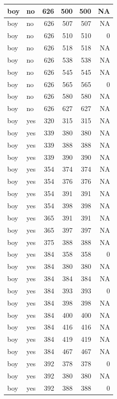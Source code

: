 \documentclass[man]{apa6}
\begin{document}
\begin{tabular}{l|l|r|r|r|r}
\hline
boy & no & 626 & 500 & 500 & NA\\
\hline
boy & no & 626 & 507 & 507 & NA\\
\hline
boy & no & 626 & 510 & 510 & 0\\
\hline
boy & no & 626 & 518 & 518 & NA\\
\hline
boy & no & 626 & 538 & 538 & NA\\
\hline
boy & no & 626 & 545 & 545 & NA\\
\hline
boy & no & 626 & 565 & 565 & 0\\
\hline
boy & no & 626 & 580 & 580 & NA\\
\hline
boy & no & 626 & 627 & 627 & NA\\
\hline
boy & yes & 320 & 315 & 315 & NA\\
\hline
boy & yes & 339 & 380 & 380 & NA\\
\hline
boy & yes & 339 & 388 & 388 & NA\\
\hline
boy & yes & 339 & 390 & 390 & NA\\
\hline
boy & yes & 354 & 374 & 374 & NA\\
\hline
boy & yes & 354 & 376 & 376 & NA\\
\hline
boy & yes & 354 & 391 & 391 & NA\\
\hline
boy & yes & 354 & 398 & 398 & NA\\
\hline
boy & yes & 365 & 391 & 391 & NA\\
\hline
boy & yes & 365 & 397 & 397 & NA\\
\hline
boy & yes & 375 & 388 & 388 & NA\\
\hline
boy & yes & 384 & 358 & 358 & 0\\
\hline
boy & yes & 384 & 380 & 380 & NA\\
\hline
boy & yes & 384 & 384 & 384 & NA\\
\hline
boy & yes & 384 & 393 & 393 & 0\\
\hline
boy & yes & 384 & 398 & 398 & NA\\
\hline
boy & yes & 384 & 400 & 400 & NA\\
\hline
boy & yes & 384 & 416 & 416 & NA\\
\hline
boy & yes & 384 & 419 & 419 & NA\\
\hline
boy & yes & 384 & 467 & 467 & NA\\
\hline
boy & yes & 392 & 378 & 378 & 0\\
\hline
boy & yes & 392 & 380 & 380 & NA\\
\hline
boy & yes & 392 & 388 & 388 & 0\\

\end{tabular}
\end{document}
